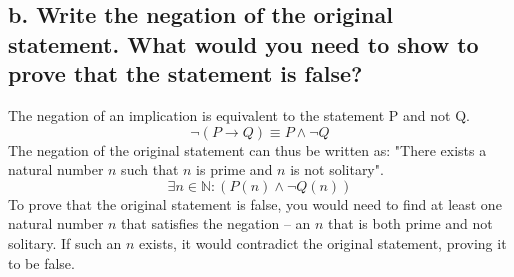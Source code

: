 \documentclass[11pt]{article}
\begin{document}
\subsection*{b. Write the negation of the original statement. What would you need to show to prove that the statement is false?}
The negation of an implication is equivalent to the statement P and not Q.
$$\neg(P\rightarrow Q) \equiv  P \wedge \neg Q$$
The negation of the original statement can thus be written as: "There exists a natural number $n$ such that $n$ is prime and $n$ is not solitary". 
$$\exists n \in \mathbb{N} : (P(n) \wedge \neg Q(n))$$
To prove that the original statement is false, you would need to find at least one natural number $n$ that satisfies the negation – an $n$ that is both prime and not solitary. If such an $n$ exists, it would contradict the original statement, proving it to be false.
\end{document}

